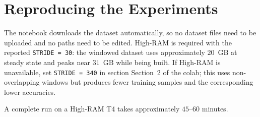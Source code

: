 
\section{Reproducing the Experiments}
\label{sec:reproducibility}

The notebook downloads the dataset automatically, so no dataset files need to be
uploaded and no paths need to be edited. High-RAM is required with the reported \texttt{STRIDE = 30}: the windowed
dataset uses approximately \(20\)~GB at steady state and peaks near \(31\)~GB
while being built. If High-RAM is unavailable, set \texttt{STRIDE = 340} in section Section~2 of the colab; this uses non-overlapping windows but
produces fewer training samples and the corresponding lower accuracies.

A complete run on a High-RAM T4 takes approximately \(45\)--\(60\) minutes.
